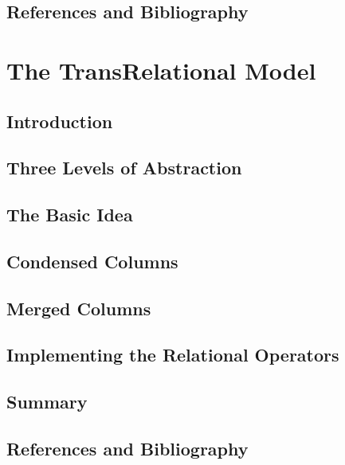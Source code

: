 \documentclass{book}
\begin{document}
\section{References and Bibliography}














\chapter{The TransRelational Model}

\section{Introduction}

\section{Three Levels of Abstraction}

\section{The Basic Idea}

\section{Condensed Columns}

\section{Merged Columns}

\section{Implementing the Relational Operators}

\section{Summary}

\section{References and Bibliography}
\end{document}
